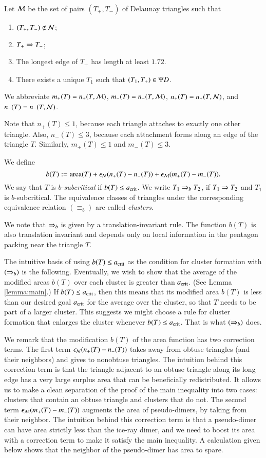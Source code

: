 Let $\mathcal M$ be the set of pairs $(T_+,T_-)$ of Delaunay triangles such that
\begin{enumerate}
\item $(T_+,T_-)\not\in \mathcal N$;
\item $T_+\Rightarrow T_-$;
\item The longest edge of $T_+$ has length  at least $1.72$.
\item There exists a unique $T_1$ such that $(T_1,T_+)\in \Psi D$.
\end{enumerate}

We abbreviate $m_+(T) = n_+(T,\mathcal M)$, $m_-(T) = n_-(T,\mathcal M)$, $n_+(T) =
n_+(T,\mathcal N)$, and $n_-(T) = n_-(T,\mathcal N)$.

\begin{remark}
  Note  that $n_+(T)\le 1$, because each triangle attaches to
  exactly one other triangle.  Also, $n_-(T)\le 3$, because each
  attachment forms along an edge of the triangle $T$.  Similarly,
  $m_+(T)\le 1$ and $m_-(T)\le 3$.
\end{remark}


We define
\[
b(T) := {\operatorname{area}}(T) + \epsilon_{\mathcal N} (n_+(T) - n_-(T)) + \epsilon_{\mathcal M} (m_+(T) - m_-(T)).
\]
We say that $T$ is {\it $b$-subcritical} if $b(T) \le a_\text{crit}$.  We write
$T_1\Rightarrow_{b} T_2$, if $T_1\Rightarrow T_2$ and $T_1$ is $b$-subcritical.  The
equivalence classes of triangles under the corresponding equivalence
relation $(\equiv_b)$ are called {\it clusters}.

We note that $\Rightarrow_{b}$ is given by a translation-invariant rule.  The
function $b(T)$ is also translation invariant and depends only on
local information in the pentagon packing near the triangle $T$.

The intuitive basis of using $b(T)\le a_\text{crit}$ as the condition for
cluster formation with $(\Rightarrow_{b})$ is the following.  Eventually, we wish
to show that the average of the modified areas $b(T)$ over each
cluster is greater than $a_\text{crit}$.  (See Lemma \ref{lemma:main}.)  If
$b(T)\le a_\text{crit}$, then this means that its modified area $b(T)$ is less
than our desired goal $a_\text{crit}$ for the average over the cluster, so that
$T$ needs to be part of a larger cluster.  This suggests we might choose
a rule for cluster formation that enlarges the cluster whenever
$b(T)\le a_\text{crit}$. That is what $(\Rightarrow_{b})$ does.

We remark that the modification $b(T)$ of the area function has two
correction terms.  The first term $\epsilon_{\mathcal N} (n_+(T) - n_-(T))$ takes away
from obtuse triangles (and their neighbors) and gives to nonobtuse
triangles.  The intuition behind this correction term is that the
triangle adjacent to an obtuse triangle along its long edge has a very
large surplus area that can be beneficially redistributed.  It allows
us to make a clean separation of the proof of the main inequality into
two cases: clusters that contain an obtuse triangle and clusters that
do not.  The second term $\epsilon_{\mathcal M} (m_+(T) - m_-(T))$ augments the area
of pseudo-dimers, by taking from their neighbor.  The intuition behind
this correction term is that a pseudo-dimer can have area strictly
less than the ice-ray dimer, and we need to boost its area with a
correction term to make it satisfy the main inequality.  A calculation
given below shows that the neighbor of the pseudo-dimer has area to
spare.

